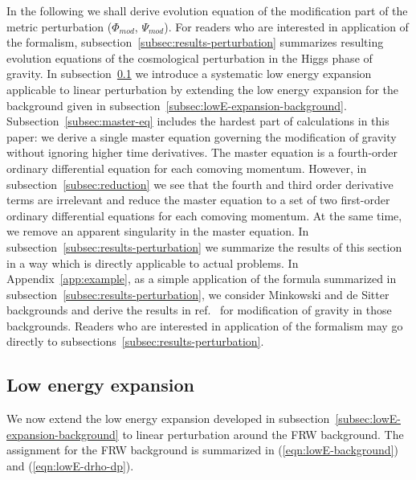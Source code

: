 In the following we shall derive evolution equation of the modification
part of the metric perturbation ($\Phi_{mod}$, $\Psi_{mod}$). For
readers who are interested in application of the formalism,
subsection~\ref{subsec:results-perturbation} summarizes resulting 
evolution equations of the cosmological perturbation in the Higgs phase
of gravity. In subsection~\ref{subsec:lowE-expansion-perturbation} we
introduce a systematic low energy expansion applicable to linear
perturbation by extending the low energy expansion for the background
given in subsection~\ref{subsec:lowE-expansion-background}. 
Subsection~\ref{subsec:master-eq} includes the hardest part of
calculations in this paper: we derive a single master equation governing 
the modification of gravity without ignoring higher time
derivatives. The master equation is a fourth-order ordinary differential 
equation for each comoving momentum. However, in 
subsection~\ref{subsec:reduction} we see that the fourth and third order 
derivative terms are irrelevant and reduce the master equation to a set 
of two first-order ordinary differential equations for each comoving 
momentum. At the same time, we remove an apparent singularity in the
master equation. In subsection~\ref{subsec:results-perturbation} we
summarize the results of this section in a way which is directly
applicable to actual problems. In Appendix~\ref{app:example}, as a 
simple application of the formula summarized in
subsection~\ref{subsec:results-perturbation}, we consider Minkowski and
de Sitter backgrounds and derive the results in
ref.~\cite{Arkani-Hamed:2003uy} for modification of gravity in those
backgrounds. Readers who are interested in application of the formalism
may go directly to subsections~\ref{subsec:results-perturbation}. 




\subsection{Low energy expansion}
\label{subsec:lowE-expansion-perturbation}


We now extend the low energy expansion developed in
subsection~\ref{subsec:lowE-expansion-background} to linear perturbation
around the FRW background. The assignment for the FRW background is
summarized in (\ref{eqn:lowE-background}) and (\ref{eqn:lowE-drho-dp}). 


